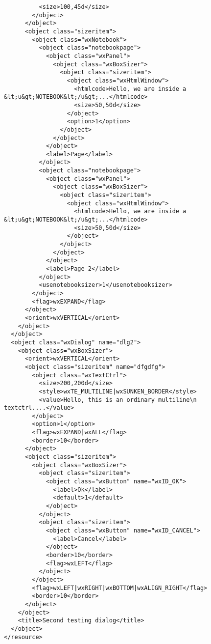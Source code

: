 \begin{verbatim}
          <size>100,45d</size>
        </object>
      </object>
      <object class="sizeritem">
        <object class="wxNotebook">
          <object class="notebookpage">
            <object class="wxPanel">
              <object class="wxBoxSizer">
                <object class="sizeritem">
                  <object class="wxHtmlWindow">
                    <htmlcode>Hello, we are inside a &lt;u&gt;NOTEBOOK&lt;/u&gt;...</htmlcode>
                    <size>50,50d</size>
                  </object>
                  <option>1</option>
                </object>
              </object>
            </object>
            <label>Page</label>
          </object>
          <object class="notebookpage">
            <object class="wxPanel">
              <object class="wxBoxSizer">
                <object class="sizeritem">
                  <object class="wxHtmlWindow">
                    <htmlcode>Hello, we are inside a &lt;u&gt;NOTEBOOK&lt;/u&gt;...</htmlcode>
                    <size>50,50d</size>
                  </object>
                </object>
              </object>
            </object>
            <label>Page 2</label>
          </object>
          <usenotebooksizer>1</usenotebooksizer>
        </object>
        <flag>wxEXPAND</flag>
      </object>
      <orient>wxVERTICAL</orient>
    </object>
  </object>
  <object class="wxDialog" name="dlg2">
    <object class="wxBoxSizer">
      <orient>wxVERTICAL</orient>
      <object class="sizeritem" name="dfgdfg">
        <object class="wxTextCtrl">
          <size>200,200d</size>
          <style>wxTE_MULTILINE|wxSUNKEN_BORDER</style>
          <value>Hello, this is an ordinary multiline\n         textctrl....</value>
        </object>
        <option>1</option>
        <flag>wxEXPAND|wxALL</flag>
        <border>10</border>
      </object>
      <object class="sizeritem">
        <object class="wxBoxSizer">
          <object class="sizeritem">
            <object class="wxButton" name="wxID_OK">
              <label>Ok</label>
              <default>1</default>
            </object>
          </object>
          <object class="sizeritem">
            <object class="wxButton" name="wxID_CANCEL">
              <label>Cancel</label>
            </object>
            <border>10</border>
            <flag>wxLEFT</flag>
          </object>
        </object>
        <flag>wxLEFT|wxRIGHT|wxBOTTOM|wxALIGN_RIGHT</flag>
        <border>10</border>
      </object>
    </object>
    <title>Second testing dialog</title>
  </object>
</resource>
\end{verbatim}

